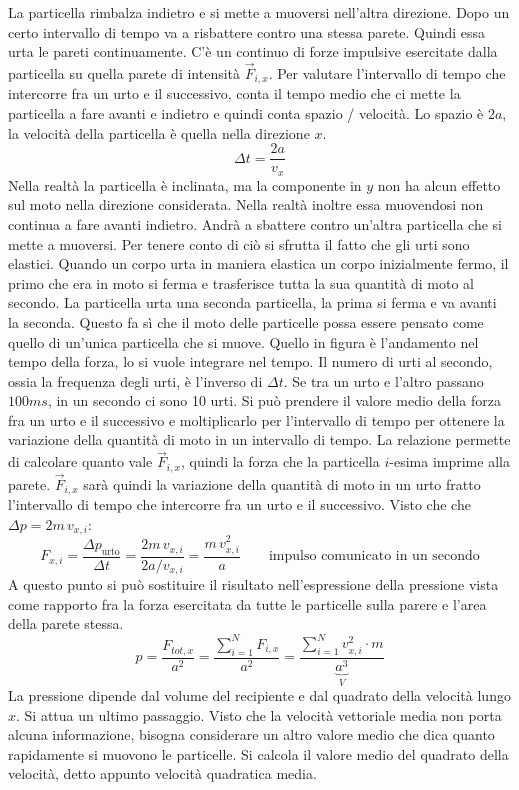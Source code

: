 \documentclass[10pt,a4paper]{book}
\begin{document}
\FloatBarrier
La particella rimbalza indietro e si mette a muoversi nell'altra direzione. Dopo un certo intervallo di tempo va a risbattere contro una stessa parete. Quindi essa urta le pareti continuamente. C'è un continuo di forze impulsive esercitate dalla particella su quella parete di intensità $\vec{F}_{i,x}$. Per valutare l'intervallo di tempo che intercorre fra un urto e il successivo, conta il tempo medio che ci mette la particella a fare avanti e indietro e quindi conta spazio / velocità. Lo spazio è $2a$, la velocità della particella è quella nella direzione $x$.
\[
	\Delta t = \frac{2a}{v_x }
\]
Nella realtà la particella è inclinata, ma la componente in $y$ non ha alcun effetto sul moto nella direzione considerata. Nella realtà inoltre essa muovendosi non continua a fare avanti indietro. Andrà a sbattere contro un'altra particella che si mette a muoversi. Per tenere conto di ciò si sfrutta il fatto che gli urti sono elastici. Quando un corpo urta in maniera elastica un corpo inizialmente fermo, il primo che era in moto si ferma e trasferisce tutta la sua quantità di moto al secondo. La particella urta una seconda particella, la prima si ferma e va avanti la seconda. Questo fa sì che il moto delle particelle possa essere pensato come quello di un'unica particella che si muove. Quello in figura è l'andamento nel tempo della forza, lo si vuole integrare nel tempo. Il numero di urti al secondo, ossia la frequenza degli urti, è l'inverso di $\Delta t$. Se tra un urto e l'altro passano $100 ms$, in un secondo ci sono 10 urti. Si può prendere il valore medio della forza fra un urto e il successivo e moltiplicarlo per l'intervallo di tempo per ottenere la variazione della quantità di moto in un intervallo di tempo. La relazione permette di calcolare quanto vale $\vec{F}_{i,x}$, quindi la forza che la particella $i$-esima imprime alla parete. $\vec{F}_{i,x}$ sarà quindi la variazione della quantità di moto in un urto fratto l'intervallo di tempo che intercorre fra un urto e il successivo.
Visto che che $\Delta p = 2m\,v_{x,i}$:
\[
	F_{x,i} = \frac{\Delta p_{\text{urto} } }{\Delta t} = \frac{2m\,v_{x,i} }{2a/v_{x,i} } = \frac{m\,v_{x,i}^2}{a} \qquad \text{impulso comunicato in un secondo}
\]
A questo punto si può sostituire il risultato nell'espressione della pressione vista come rapporto fra la forza esercitata da tutte le particelle sulla parere e l'area della parete stessa.
\[
	p = \frac{F_{tot,x}}{a^2} = \frac{\sum_{i=1}^N F_{i,x}  }{a^2} = \frac{\sum_{i=1}^N v_{x,i}^2\cdot m}{\underbrace{a^3}_V}
\]
La pressione dipende dal volume del recipiente e dal quadrato della velocità lungo $x$. Si attua un ultimo passaggio. Visto che la velocità vettoriale media non porta alcuna informazione, bisogna considerare un altro valore medio che dica quanto rapidamente si muovono le particelle. Si calcola il valore medio del quadrato della velocità, detto appunto velocità quadratica media.
\end{document}
